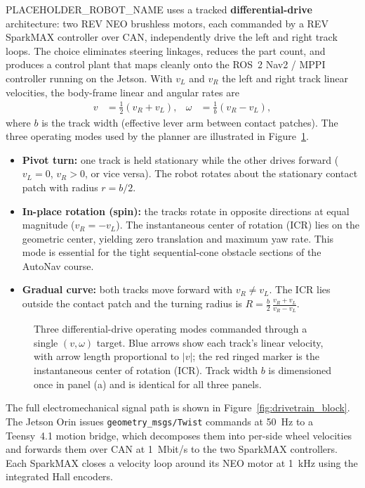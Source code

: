 \documentclass[11pt, letterpaper]{article}
\newcommand{\robotname}{PLACEHOLDER\_ROBOT\_NAME}
\begin{document}
\robotname{} uses a tracked \textbf{differential-drive} architecture: two REV NEO
brushless motors, each commanded by a REV SparkMAX controller over CAN, independently
drive the left and right track loops. The choice eliminates steering linkages, reduces
the part count, and produces a control plant that maps cleanly onto the ROS~2 Nav2 / MPPI
controller running on the Jetson. With $v_L$ and $v_R$ the left and right track linear
velocities, the body-frame linear and angular rates are
\begin{align}
    v &= \tfrac{1}{2}(v_R + v_L), &
    \omega &= \tfrac{1}{b}(v_R - v_L),
\end{align}
where $b$ is the track width (effective lever arm between contact patches). The three
operating modes used by the planner are illustrated in
Figure~\ref{fig:diff_drive_kinematics}.

\begin{itemize}
    \item \textbf{Pivot turn:} one track is held stationary while the other drives forward
    ($v_L=0$, $v_R>0$, or vice versa). The robot rotates about the stationary contact
    patch with radius $r = b/2$.
    \item \textbf{In-place rotation (spin):} the tracks rotate in opposite directions at
    equal magnitude ($v_R = -v_L$). The instantaneous center of rotation (ICR) lies on
    the geometric center, yielding zero translation and maximum yaw rate. This mode is
    essential for the tight sequential-cone obstacle sections of the AutoNav course.
    \item \textbf{Gradual curve:} both tracks move forward with $v_R \neq v_L$. The ICR
    lies outside the contact patch and the turning radius is $R = \tfrac{b}{2}\,
    \tfrac{v_R + v_L}{v_R - v_L}$.
\end{itemize}

\begin{figure}[H]
    \centering
    
    \caption{Three differential-drive operating modes commanded through a single
    $(v,\omega)$ target. Blue arrows show each track's linear velocity, with
    arrow length proportional to $|v|$; the red ringed marker is the
    instantaneous center of rotation ($\mathrm{ICR}$). Track width $b$ is
    dimensioned once in panel (a) and is identical for all three panels.}
    \label{fig:diff_drive_kinematics}
\end{figure}

The full electromechanical signal path is shown in Figure~\ref{fig:drivetrain_block}.
The Jetson Orin issues \texttt{geometry\_msgs/}\allowbreak\texttt{Twist} commands at
50~Hz to a Teensy~4.1 motion bridge, which decomposes them into per-side wheel
velocities and forwards them over CAN at 1~Mbit/s to the two SparkMAX controllers.
Each SparkMAX closes a velocity loop around its NEO motor at 1~kHz using the integrated
Hall encoders.
\end{document}
